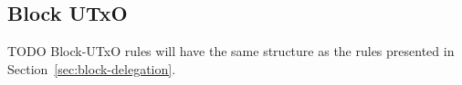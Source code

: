 \documentclass[11pt,a4paper]{article}
\newenvironment{todo}
  {\begin{bclogo}[logo=\bcoutil, couleur=red!5, couleurBarre=red, arrondi=0.2]{ TODO}}
    {\end{bclogo}}
\begin{document}
\subsection{Block UTxO}
\label{sec:block-utxo}


\begin{todo}
  Block-UTxO rules will have the same structure as the rules presented in
  Section~\ref{sec:block-delegation}.
\end{todo}
\end{document}
